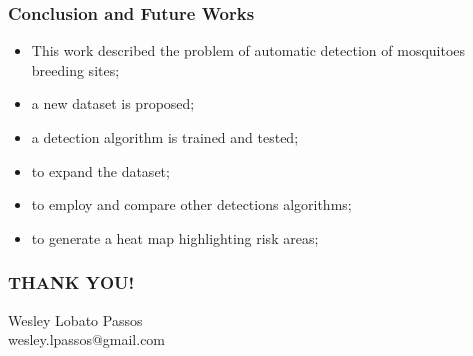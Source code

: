 \documentclass{beamer}
\begin{document}
		\begin{frame}
			\frametitle{Conclusion and Future Works}

		\begin{itemize}
			\item This work described the problem of automatic detection of mosquitoes breeding sites;
			\item a new dataset is proposed;
			\item a detection algorithm is trained and tested;
		\end{itemize}

		\begin{itemize}
			\item to expand the dataset;
			\item to employ and compare other detections algorithms;
			\item to generate a heat map highlighting risk areas;
		\end{itemize}

		\end{frame}


		\begin{frame}
			\frametitle{THANK YOU!}
			\centering
			Wesley Lobato Passos\\
			wesley.lpassos@gmail.com
		\end{frame}
\end{document}

